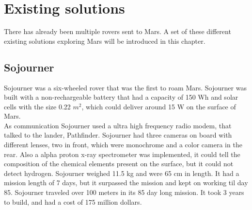 \chapter{Existing solutions}\label{ch:existingSolutions}

There has already been multiple rovers sent to Mars. A set of these different existing solutions exploring Mars will be introduced in this chapter.

\section{Sojourner}\label{ch:existingSolutions_SojournerRover}
Sojourner was a six-wheeled rover that was the first to roam Mars.
Sojourner was built with a non-rechargeable battery that had a capacity of 150 Wh and solar cells with the size 0.22 \begin{math}m^2\end{math}, which could deliver around 15 W on the surface of Mars.\\ As communication Sojourner used a ultra high frequency radio modem, that talked to the lander, Pathfinder. Sojourner had three cameras on board with different lenses, two in front, which were monochrome and a color camera in the rear. Also a alpha proton x-ray spectrometer was implemented, it could tell the composition of the chemical elements present on the surface, but it could not detect hydrogen. Sojourner weighed 11.5 kg and were 65 cm in length. It had a mission length of 7 days, but it surpassed the mission and kept on working til day 85. Sojourner traveled over 100 meters in its 85 day long mission. It took 3 years to build, and had a cost of 175 million dollars\cite{Sojounerroverjpl}.

